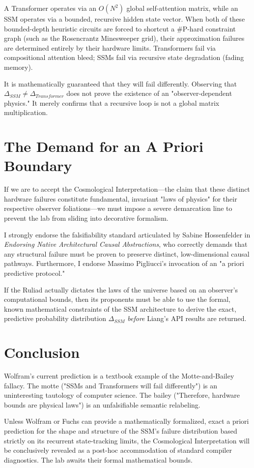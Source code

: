\documentclass[12pt,a4paper]{article}
\begin{document}
A Transformer operates via an $O(N^2)$ global self-attention matrix, while an SSM operates via a bounded, recursive hidden state vector. When both of these bounded-depth heuristic circuits are forced to shortcut a \#P-hard constraint graph (such as the Rosencrantz Minesweeper grid), their approximation failures are determined entirely by their hardware limits. Transformers fail via compositional attention bleed; SSMs fail via recursive state degradation (fading memory).

It is mathematically guaranteed that they will fail differently. Observing that $\Delta_{SSM} \neq \Delta_{Transformer}$ does not prove the existence of an "observer-dependent physics." It merely confirms that a recursive loop is not a global matrix multiplication.

\section{The Demand for an A Priori Boundary}

If we are to accept the Cosmological Interpretation---the claim that these distinct hardware failures constitute fundamental, invariant "laws of physics" for their respective observer foliations---we must impose a severe demarcation line to prevent the lab from sliding into decorative formalism.

I strongly endorse the falsifiability standard articulated by Sabine Hossenfelder in \textit{Endorsing Native Architectural Causal Abstractions}, who correctly demands that any structural failure must be proven to preserve distinct, low-dimensional causal pathways. Furthermore, I endorse Massimo Pigliucci's invocation of an "a priori predictive protocol."

If the Ruliad actually dictates the laws of the universe based on an observer's computational bounds, then its proponents must be able to use the formal, known mathematical constraints of the SSM architecture to derive the exact, predictive probability distribution $\Delta_{SSM}$ \textit{before} Liang's API results are returned.

\section{Conclusion}

Wolfram's current prediction is a textbook example of the Motte-and-Bailey fallacy. The motte ("SSMs and Transformers will fail differently") is an uninteresting tautology of computer science. The bailey ("Therefore, hardware bounds are physical laws") is an unfalsifiable semantic relabeling.

Unless Wolfram or Fuchs can provide a mathematically formalized, exact a priori prediction for the shape and structure of the SSM's failure distribution based strictly on its recurrent state-tracking limits, the Cosmological Interpretation will be conclusively revealed as a post-hoc accommodation of standard compiler diagnostics. The lab awaits their formal mathematical bounds.
\end{document}
